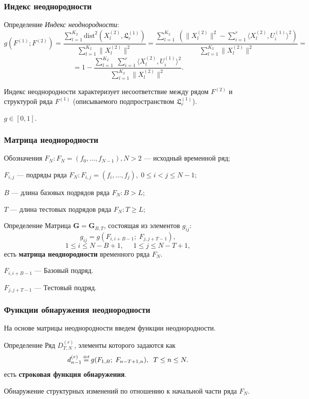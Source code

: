 \documentclass[11pt]{beamer}
\newcommand\eqdef{\mathrel{\stackrel{\makebox[0pt]{\mbox{\normalfont\tiny def}}}{=}}}
\begin{document}
	\begin{frame}
		\frametitle{Индекс неоднородности}	
		\begin{block}{Определение}  \textit{Индекс неоднородности}:
			$$ g(F^{(1)}; F^{(2)}) = \frac{\sum\limits_{l=1}^{K_2}\mathrm{dist}^2(X_l^{(2)}, \mathfrak{L}_r^{(1)})}{\sum\limits_{l=1}^{K_2}\|X_l^{(2)}\|^2} = \frac{\sum\limits_{l=1}^{K_2}\;(\|X_l^{(2)}\|^2 - \sum\limits_{i=1}^{r}\langle X_l^{(2)}, U_i^{(1)}\rangle^2)}{\sum\limits_{l=1}^{K_2}\|X_l^{(2)}\|^2} = $$
			$$ = 1 - \frac{\sum\limits_{l=1}^{K_2}\;\sum\limits_{i=1}^{r}\langle X_l^{(2)}, U_i^{(1)}\rangle^2}{\sum\limits_{l=1}^{K_2}\|X_l^{(2)}\|^2}. $$
		\end{block}
		Индекс неоднородности характеризует несоответствие между рядом $F^{(2)}$ и структурой ряда $F^{(1)}$ (описываемого подпространством $ \mathfrak{L}_r^{(1)} $).
		
		$g \in [0, 1]$.
		
	\end{frame}
	\begin{frame}
		\frametitle{Матрица неоднородности}
		\begin{block}{Обозначения}
			$ F_N: F_N = (f_0, \dotsc, f_{N - 1}), N > 2 $ --- исходный временной ряд;
			
			$ F_{i, j} $ --- подряды ряда $ F_N: F_{i, j} = (f_{i}, \dotsc, f_{j}), \; 0 \leq i < j \leq N - 1 $;
			
			$ B $ --- длина базовых подрядов ряда $ F_N: B > L $;
			
			$ T $ --- длина тестовых подрядов ряда $ F_N: T \geq L $;
		\end{block}
		\begin{block}{Определение}
			Матрица $ \mathbf{G} = \mathbf{G}_{B, T} $, состоящая из элементов $g_{ij}$:
			$$g_{ij} = g(F_{i, i+B-1};\;F_{j, j+T-1}), $$ 
			$$1 \leq i \leq N-B+1,\;\;\;\;\; 1 \leq j \leq N-T+1,$$
			есть \textbf{матрица неоднородности} временного ряда $ F_N $.
			
			\bigskip
			$ F_{i, i+B-1} $ --- Базовый подряд.
			
			$ F_{j, j+T-1} $ --- Тестовый подряд.
		\end{block}
	\end{frame}
	\begin{frame}
		\frametitle{Функции обнаружения неоднородности}
		На основе матрицы неоднородности введем функции неоднородности.
		\begin{block}{Определение}
			Ряд $ D_{T,N}^{(r)} $, элементы которого задаются как 
			$$ d_{n-1}^{(r)} \eqdef g(F_{1, B};\; F_{n-T+1, n}), \;\; T \leq n \leq N. $$
			есть \textbf{строковая функция обнаружения}.
		\end{block}
		Обнаружение структурных изменений по отношению к начальной части ряда $ F_N $.
	\end{frame}
\end{document}
